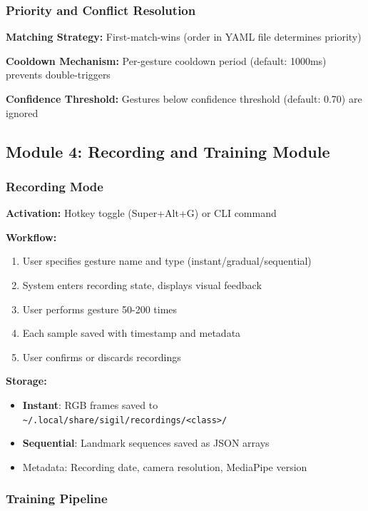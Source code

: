 \documentclass[11pt,a4paper]{article}
\begin{document}
\subsubsection{Priority and Conflict Resolution}

\textbf{Matching Strategy:} First-match-wins (order in YAML file determines priority)

\textbf{Cooldown Mechanism:} Per-gesture cooldown period (default: 1000ms) prevents double-triggers

\textbf{Confidence Threshold:} Gestures below confidence threshold (default: 0.70) are ignored

\subsection{Module 4: Recording and Training Module}

\subsubsection{Recording Mode}

\textbf{Activation:} Hotkey toggle (Super+Alt+G) or CLI command

\textbf{Workflow:}
\begin{enumerate}
\item User specifies gesture name and type (instant/gradual/sequential)
\item System enters recording state, displays visual feedback
\item User performs gesture 50-200 times
\item Each sample saved with timestamp and metadata
\item User confirms or discards recordings
\end{enumerate}

\textbf{Storage:}
\begin{itemize}
\item \textbf{Instant}: RGB frames saved to \texttt{\textasciitilde/.local/share/sigil/recordings/<class>/}
\item \textbf{Sequential}: Landmark sequences saved as JSON arrays
\item Metadata: Recording date, camera resolution, MediaPipe version
\end{itemize}

\subsubsection{Training Pipeline}
\end{document}
